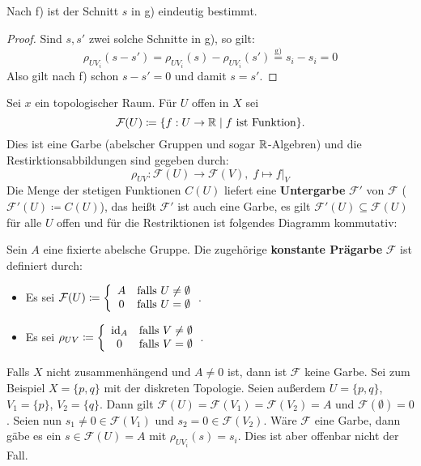 \begin{bem}
	Nach f) ist der Schnitt $s$ in g) eindeutig bestimmt.
	\begin{proof}
		Sind $s, s'$ zwei solche Schnitte in g), so gilt:
		\[
			\rho_{UV_i}(s-s') = \rho_{UV_i}(s) - \rho_{UV_i}(s') \overset{\text{g)}}{=}s_i-s_i = 0 
		\]
		Also gilt nach f) schon $s-s'=0$ und damit $s=s'$.
	\end{proof}
\end{bem}

\begin{bsp}
\label{bsp:1.5}
	Sei $x$ ein topologischer Raum. Für $U$ offen in $X$ sei
	\[
		\mathcal{F}(U)\coloneqq \{f:U\to \mathbb {R} \mid f \text{ ist Funktion}\}.
	\]
	Dies ist eine Garbe (abelscher Gruppen und sogar $\mathbb {R}$-Algebren) und die Restirktionsabbildungen sind gegeben durch:
	\[
		\rho_{UV}:\mathcal{F}(U) \to \mathcal{F}(V),\; f \mapsto f\vert_V
	\]
	Die Menge der stetigen Funktionen $C(U)$ liefert eine \textbf{Untergarbe} $\mathcal{F}'$ von $\mathcal{F}$ ($\mathcal{F}'(U)\coloneqq C(U)$), das heißt $\mathcal{F}'$ ist auch eine Garbe, es gilt $\mathcal{F}'(U)\subseteq \mathcal{F}(U)$ für alle $U$ offen und für die Restriktionen ist folgendes Diagramm kommutativ:
	\begin{center}
	\end{center}

\end{bsp}

\begin{bsp}
	Sein $A$ eine fixierte abelsche Gruppe. Die zugehörige \textbf{konstante Prägarbe} $\mathcal{F}$ ist definiert durch:
	\begin{itemize}
		\item Es sei $\mathcal{F}(U) \coloneqq \left\lbrace \begin{array}{c c}A & \text{falls } U \neq \emptyset\\0& \text{falls } U = \emptyset\end{array}\right.$.
		\item Es sei $\rho_{UV} \coloneqq \left\lbrace \begin{array}{c c}\operatorname{id}_A & \text{falls } V \neq \emptyset\\0& \text{falls } V = \emptyset\end{array}\right.$.
	\end{itemize}
	Falls $X$ nicht zusammenhängend und $A \neq 0$ ist, dann ist $\mathcal{F}$ keine Garbe. Sei zum Beispiel $X=\{p,q\}$ mit der diskreten Topologie. Seien außerdem $U=\{p,q\}$, $V_1=\{p\}$, $V_2=\{q\}$. Dann gilt $\mathcal{F}(U)=\mathcal{F}(V_1)=\mathcal{F}(V_2) = A$ und $\mathcal{F}(\emptyset)=0$. Seien nun $s_1 \neq 0 \in \mathcal{F}(V_1)$ und $s_2 = 0 \in \mathcal{F}(V_2)$. Wäre $\mathcal{F}$ eine Garbe, dann gäbe es ein $s \in \mathcal{F}(U) = A$ mit $\rho_{UV_i}(s) = s_i$. Dies ist aber offenbar nicht der Fall.
\end{bsp}

